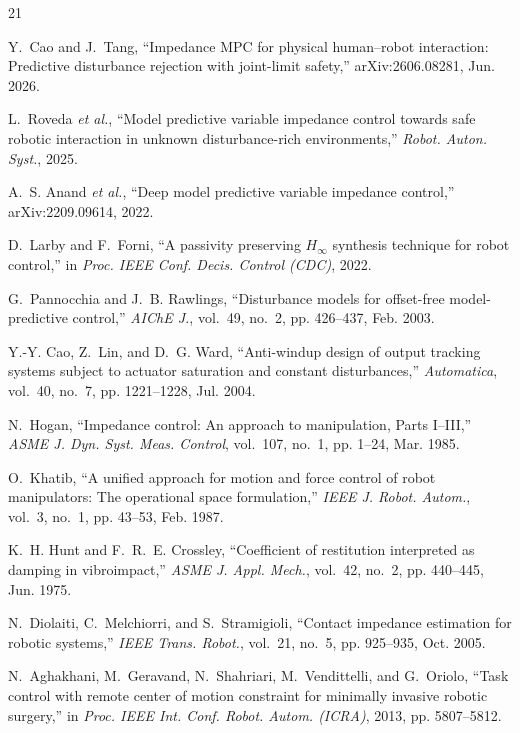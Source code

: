 \begin{thebibliography}{21}

Y.~Cao and J.~Tang, ``Impedance MPC for physical human--robot interaction: Predictive disturbance rejection with joint-limit safety,'' arXiv:2606.08281, Jun. 2026.

L.~Roveda \emph{et al.}, ``Model predictive variable impedance control towards safe robotic interaction in unknown disturbance-rich environments,'' \emph{Robot. Auton. Syst.}, 2025.

A.~S. Anand \emph{et al.}, ``Deep model predictive variable impedance control,'' arXiv:2209.09614, 2022.

D.~Larby and F.~Forni, ``A passivity preserving $H_\infty$ synthesis technique for robot control,'' in \emph{Proc. IEEE Conf. Decis. Control (CDC)}, 2022.

G.~Pannocchia and J.~B. Rawlings, ``Disturbance models for offset-free model-predictive control,'' \emph{AIChE J.}, vol.~49, no.~2, pp. 426--437, Feb. 2003.

Y.-Y. Cao, Z.~Lin, and D.~G. Ward, ``Anti-windup design of output tracking systems subject to actuator saturation and constant disturbances,'' \emph{Automatica}, vol.~40, no.~7, pp. 1221--1228, Jul. 2004.

N.~Hogan, ``Impedance control: An approach to manipulation, Parts I--III,'' \emph{ASME J. Dyn. Syst. Meas. Control}, vol.~107, no.~1, pp. 1--24, Mar. 1985.

O.~Khatib, ``A unified approach for motion and force control of robot manipulators: The operational space formulation,'' \emph{IEEE J. Robot. Autom.}, vol.~3, no.~1, pp. 43--53, Feb. 1987.

K.~H. Hunt and F.~R.~E. Crossley, ``Coefficient of restitution interpreted as damping in vibroimpact,'' \emph{ASME J. Appl. Mech.}, vol.~42, no.~2, pp. 440--445, Jun. 1975.

N.~Diolaiti, C.~Melchiorri, and S.~Stramigioli, ``Contact impedance estimation for robotic systems,'' \emph{IEEE Trans. Robot.}, vol.~21, no.~5, pp. 925--935, Oct. 2005.

N.~Aghakhani, M.~Geravand, N.~Shahriari, M.~Vendittelli, and G.~Oriolo, ``Task control with remote center of motion constraint for minimally invasive robotic surgery,'' in \emph{Proc. IEEE Int. Conf. Robot. Autom. (ICRA)}, 2013, pp. 5807--5812.


\end{thebibliography}
